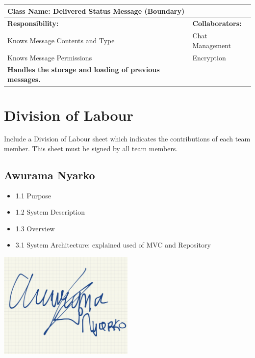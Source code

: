 \documentclass[]{article}
\begin{document}
\begin{itemize}
\begin{table}[ht]
\begin{tabular}{|p{7cm}|p{7cm}|}
		\end{tabular}
	\end{table}


	\begin{table}[ht]
		\centering
		\begin{tabular}{|p{7cm}|p{7cm}|}
		\hline 
		 \multicolumn{2}{|l|}{\textbf{Class Name:} Delivered Status Message (Boundary)} \\
		\hline
		\textbf{Responsibility:} & \textbf{Collaborators:} \\
		\hline
            Knows Message Contents and Type & Chat Management\\
            Knows Message Permissions & Encryption\\
            \vspace{0.1in}
            \textbf{Handles the storage and loading of previous messages.}

		\vspace{1in} & \\
		\hline
  
		\end{tabular}
	\end{table}
\end{itemize}



\clearpage

\clearpage

\appendix
\section{Division of Labour}
\label{sec:division_of_labour}
Include a Division of Labour sheet which indicates the contributions of each team member. This sheet must be signed by all team members.
\subsection{Awurama Nyarko}
\label{subsec:awurama_nyarko}
\begin{itemize}
	\item 1.1 Purpose
	\item 1.2 System Description
	\item 1.3 Overview
	\item 3.1 System Architecture: explained used of MVC and Repository
\end{itemize}
\includegraphics[width=0.5\textwidth]{awurama.jpg}
\end{document}
